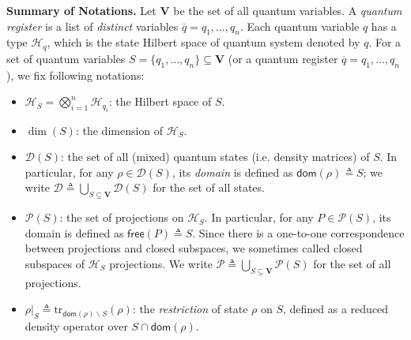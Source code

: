 \documentclass[conference,compsoc, 10pt]{IEEEtran}
\newcommand {\qbar} {{\overline{q}}}
\newcommand {\cD } {{\mathcal{D}}}
\newcommand {\cP } {{\mathcal{P}}}
\newcommand {\cH } {{\mathcal{H}}}
\newcommand {\dom }[1] {{\mathsf{dom}\!\left(#1\right)}}
\newcommand {\free }[1] {{\mathsf{free}\left(#1\right)}}
\newcommand {\rt }[2] {{\left.{#1}\right|_{#2}}}
\newcommand {\tr } {{\mathrm{tr}}}
\newcommand {\vars } {\mathbf{V}}
\begin{document}
	\vspace{0.2cm}
	\noindent\textbf{Summary of Notations.}
	Let $\vars$ be  the set of all quantum variables. A \emph{quantum register} is a list of \emph{distinct} variables $\qbar = q_1,\dots,q_n$. Each quantum variable $q$ has a type $\cH_q$, which is the state Hilbert space of quantum system denoted by $q$.
	For a set of quantum variables $S = \{q_1,\dots,q_n\}\subseteq \vars$ (or a quantum register $\qbar = q_1,\dots,q_n$), we fix following notations:
	\begin{itemize}
		\item $\cH_S = \bigotimes_{i=1}^n\cH_{q_i}$: the Hilbert space of $S$.
		\item $\dim(S)$: the dimension of $\cH_S$.
    \item $\cD(S)$: the set of all (mixed) quantum states (i.e. density matrices)
      of $S$. In particular, for any $\rho\in\cD(S)$, its \emph{domain} is
      defined as $\dom{\rho}\triangleq S$; we write $\cD \triangleq
      \bigcup_{S\subseteq \vars}\cD(S)$ for the set of all states.
    \item $\cP(S)$: the set of projections on $\cH_S$. In particular, for any
      $P\in\cP(S)$, its domain is defined as $\free{P} \triangleq S$.  Since
      there is a one-to-one correspondence between projections and closed
      subspaces, we sometimes called closed subspaces of $\cH_S$ projections.
      We write $\cP\triangleq \bigcup_{S\subseteq \vars}\cP(S)$ for the set of
      all projections.
		\item $
		\rt{\rho}{S} \triangleq 
		\tr_{\dom{\rho}\backslash S}(\rho)
		$: the \emph{restriction} of state $\rho$ on $S$,  defined as a reduced density operator over $S\cap\dom{\rho}$. 
	\end{itemize}
\end{document}
